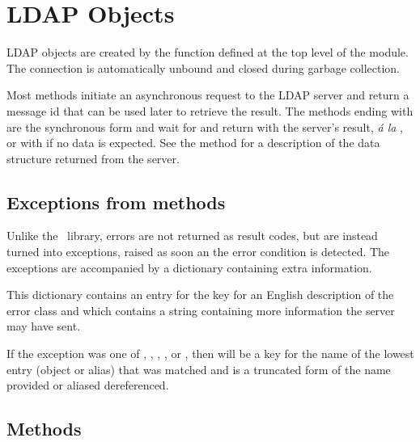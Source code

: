 

\section{LDAP Objects}

\noindent
LDAP objects are created by the  function defined at the top 
level of the module. The connection is automatically unbound and closed 
during garbage collection.

Most methods initiate an asynchronous request to the LDAP server 
and return a message id that can be used later to retrieve the result. 
The methods ending with  are the synchronous form and wait for and
return with
the server's result, \textit{\'{a} la} , or with
 if no data is expected. See the  method
for a description of the data structure returned from the server.

\subsection{Exceptions from methods}
\label{subsec:exceptfrommeth}

Unlike the \C\ library, errors are not returned as result codes, but
are instead turned into exceptions, raised as soon an the error condition 
is detected. The exceptions are accompanied by a dictionary containing
extra information. 

This dictionary contains an entry for the key  
for an English description of the error class and  which
contains a string containing more information the server may have sent.

If the exception was one of 
, 
, 
, 
, or 
, 
then  will be a key for
the name of the lowest entry (object or alias) that was matched and is a 
truncated form of the name provided or aliased dereferenced.


\subsection{Methods}


